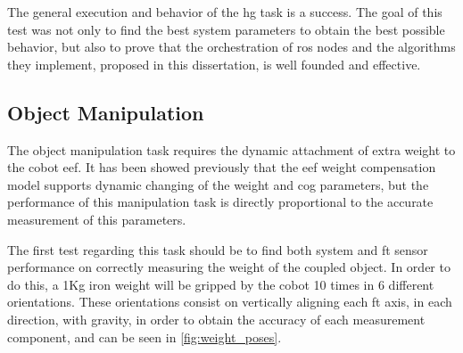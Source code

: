 \par The general execution and behavior of the \ac{hg} task is a success. The goal of this test was not only to find the best system parameters to obtain the best possible behavior, but also to prove that the orchestration of \ac{ros} nodes and the algorithms they implement, proposed in this dissertation, is well founded and effective.

\subsection{Object Manipulation}

\par The object manipulation task requires the dynamic attachment of extra weight to the cobot \ac{eef}. It has been showed previously that the \ac{eef} weight compensation model supports dynamic changing of the weight and \ac{cog} parameters, but the performance of this manipulation task is directly proportional to the accurate measurement of this parameters.
\par The first test regarding this task should be to find both system and \ac{ft} sensor performance on correctly measuring the weight of the coupled object. In order to do this, a 1Kg iron weight will be gripped by the cobot 10 times in 6 different orientations. These orientations consist on vertically aligning each \ac{ft} axis, in each direction, with gravity, in order to obtain the accuracy of each measurement component, and can be seen in \autoref{fig:weight_poses}.

